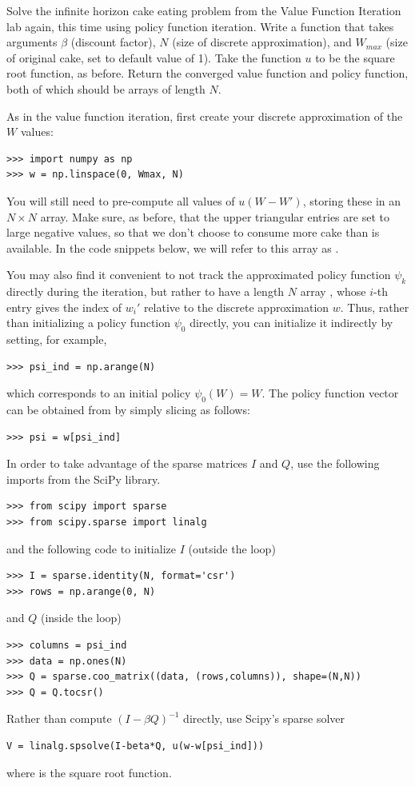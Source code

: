 \begin{problem}
\label{prob:cake_eating_policyfun}
Solve the infinite horizon cake eating problem from the Value Function Iteration lab again, this time using policy function iteration.
Write a function  that takes arguments $\beta$ (discount factor), $N$ (size of discrete approximation), and
$W_{max}$ (size of original cake, set to default value of 1). Take the function $u$ to be the square root function, as before.
Return the converged value function and policy function, both of which should be arrays of length $N$.

As in the value function iteration, first create your discrete approximation of the $W$ values:
\begin{lstlisting}
>>> import numpy as np
>>> w = np.linspace(0, Wmax, N)
\end{lstlisting}

You will still need to pre-compute all values of $u(W-W')$, storing these in an $N \times N$ array. Make sure, as before,
that the upper triangular entries are set to large negative values, so that we don't choose to consume more cake than is
available. In the code snippets below, we will refer to this array as .

You may also find it convenient to not track the approximated policy function $\psi_k$ directly during the iteration, but
rather to have a length $N$ array , whose $i$-th entry gives the index of $w_i'$ relative to the discrete approximation
$w$. Thus, rather than initializing a policy function $\psi_0$ directly, you can initialize it indirectly by setting, for example,
\begin{lstlisting}
>>> psi_ind = np.arange(N)
\end{lstlisting}
which corresponds to an initial policy $\psi_0(W) = W$.
The policy function vector can be obtained from  by simply slicing  as follows:
\begin{lstlisting}
>>> psi = w[psi_ind]
\end{lstlisting}

In order to take advantage of the sparse matrices $I$ and $Q$, use the following imports from the SciPy  library.
\begin{lstlisting}
>>> from scipy import sparse
>>> from scipy.sparse import linalg
\end{lstlisting}
and the following code to initialize $I$ (outside the loop)
\begin{lstlisting}
>>> I = sparse.identity(N, format='csr')
>>> rows = np.arange(0, N)
\end{lstlisting}
and $Q$ (inside the loop)
\begin{lstlisting}
>>> columns = psi_ind
>>> data = np.ones(N)
>>> Q = sparse.coo_matrix((data, (rows,columns)), shape=(N,N))
>>> Q = Q.tocsr()
\end{lstlisting}
Rather than compute $(I-\beta Q)^{-1}$ directly, use Scipy's sparse solver
\begin{lstlisting}
V = linalg.spsolve(I-beta*Q, u(w-w[psi_ind]))
\end{lstlisting}
where  is the square root function.


\end{problem}
